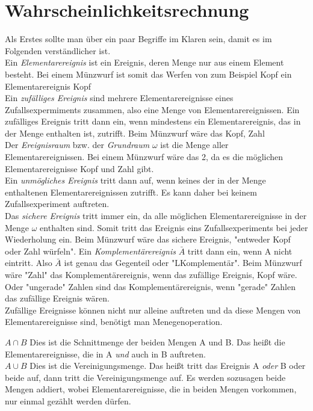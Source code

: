 \documentclass[a4paper]{article}
\begin{document}
\section{Wahrscheinlichkeitsrechnung}
Als Erstes sollte man über ein paar Begriffe im Klaren sein, damit es im Folgenden verständlicher ist.\\
Ein \textit{Elementarereignis} ist ein Ereignis, deren Menge nur aus einem Element besteht. Bei einem Münzwurf ist somit das Werfen von zum Beispiel Kopf ein Elementarereignis {Kopf}\\
Ein \textit{zufälliges Ereignis} sind mehrere Elementarereignisse eines Zufallsexpermiments zusammen, also eine Menge von Elementarereignissen. Ein zufälliges Ereignis tritt dann ein, wenn mindestens ein Elementarereignis, das in der Menge enthalten ist, zutrifft. Beim Münzwurf wäre das {Kopf, Zahl}\\
Der \textit{Ereignisraum} bzw. der \textit{Grundraum} $\omega$ ist die Menge aller Elementarereignissen. Bei einem Münzwurf wäre das 2, da es die möglichen Elementarereignisse Kopf und Zahl gibt.\\
Ein \textit{unmögliches Ereignis} tritt dann auf, wenn keines der in der Menge enthaltenen Elementarereignissen zutrifft. Es kann daher bei keinem Zufallsexperiment auftreten.\\
Das \textit{sichere Ereignis} tritt immer ein, da alle möglichen Elementarereignisse in der Menge $\omega$ enthalten sind. Somit tritt das Ereignis eins Zufallsexperiments bei jeder Wiederholung ein. Beim Münzwurf wäre das sichere Ereignis, "entweder Kopf oder Zahl würfeln".
Ein \textit{Komplementärereignis} $\bar A$ tritt dann ein, wenn A nicht eintritt. Also $\bar A$ ist genau das Gegenteil oder "LKomplementär". Beim Münzwurf wäre "Zahl" das Komplementärereignis, wenn das zufällige Ereignis, {Kopf} wäre. Oder "ungerade" Zahlen sind das Komplementärereignis, wenn "gerade" Zahlen das zufällige Ereignis wären.\\

Zufällige Ereignisse können nicht nur alleine auftreten und da diese Mengen von Elementarereignisse sind, benötigt man Menegenoperation.

\textbf{$A\cap B$} Dies ist die Schnittmenge der beiden Mengen A und B. Das heißt die Elementarereignisse, die in A \textit{und} auch in B auftreten.\\
\textbf{$A\cup B$} Dies ist die Vereinigungsmenge. Das heißt tritt das Ereignis A \textit{oder} B oder beide auf, dann tritt die Vereinigungsmenge auf. Es werden sozusagen beide Mengen addiert, wobei Elementarereignisse, die in  beiden Mengen vorkommen, nur einmal gezählt werden dürfen.\\
\end{document}
